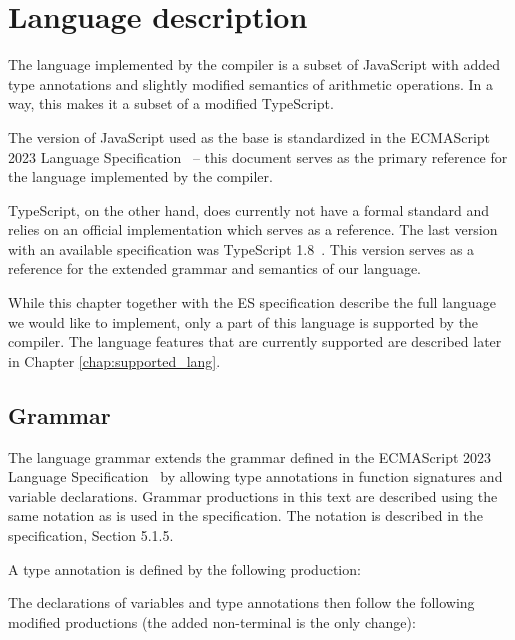 \chapter{Language description}\label{language}

The language implemented by the compiler is a subset of JavaScript with added type annotations and slightly modified semantics of arithmetic operations. In a way, this makes it a subset of a modified TypeScript.

The version of JavaScript used as the base is standardized in the ECMAScript 2023 Language Specification~\cite{ecma262} -- this document serves as the primary reference for the language implemented by the compiler.

TypeScript, on the other hand, does currently not have a formal standard and relies on an official implementation which serves as a reference. The last version with an available specification was TypeScript 1.8~\cite{typescript18}. This version serves as a reference for the extended grammar and semantics of our language.

While this chapter together with the ES specification describe the full language we would like to implement, only a part of this language is supported by the compiler. The language features that are currently supported are described later in Chapter \ref{chap:supported_lang}.


\section{Grammar}\label{lang:grammar}

The language grammar extends the grammar defined in the ECMAScript 2023 Language Specification~\cite{ecma262} by allowing type annotations in function signatures and variable declarations. Grammar productions in this text are described using the same notation as is used in the specification. The notation is described in the specification, Section 5.1.5.

A type annotation is defined by the following production:

\GrammarRule[TypeAnnotation]{}{
    \terminal{:} \nonterminal[Identifier]{}{}
}


The declarations of variables and type annotations then follow the following modified productions (the added \nonterminal[TypeAnnotation]{}{} non-terminal is the only change):


